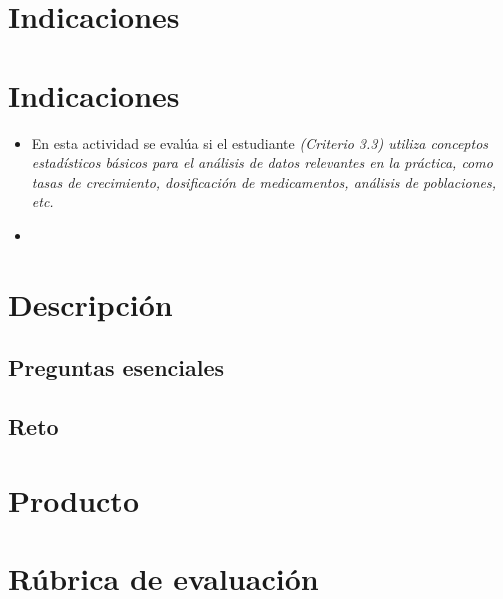 \documentclass[a4,11pt]{aleph-notas}
\begin{document}
\encabezado

\vspace*{-10mm}
\section{Indicaciones}

\section*{Indicaciones}
\begin{itemize}[leftmargin=*]
\item 
    En esta actividad se evalúa si el estudiante \textit{(Criterio 3.3) utiliza conceptos estadísticos básicos para el análisis de datos relevantes en la práctica, como tasas de crecimiento, dosificación de medicamentos, análisis de poblaciones, etc.}
\item 
    
\end{itemize}

\section{Descripción}


\subsection{Preguntas esenciales}

\subsection{Reto}





\section{Producto}


\section{Rúbrica de evaluación}
\end{document}
